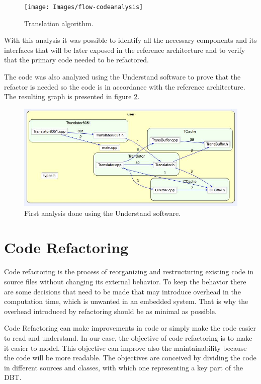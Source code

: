 \documentclass{report}
\begin{document}
	\begin{figure} [H]
		\centering
		\texttt{[image: Images/flow-codeanalysis]}
		\caption{Translation algorithm.}
		\label{fig:flowchart-codeanalysis}
	\end{figure}	
	
	\par With this analysis it was possible to identify all the necessary components and its interfaces that will be later exposed in the reference architecture and to verify that the primary code needed to be refactored.

	\par The code was also analyzed using the Understand software to prove that the refactor is needed so the code is in accordance with the reference architecture. The resulting graph is presented in figure \ref{fig:understand1}.
	
	\begin{figure} [H]
		\centering
		\includegraphics[width=0.6\linewidth]{Images/refactor1.jpg}
		\caption{First analysis done using the Understand software.}
		\label{fig:understand1}
	\end{figure}

	\section{Code Refactoring}
	Code refactoring is the process of reorganizing and restructuring existing code in source files without changing its external behavior. To keep the behavior there are some decisions that need to be made that may introduce overhead in the computation time, which is unwanted in an embedded system. That is why the overhead introduced by refactoring should be as minimal as possible.
	
	Code Refactoring can make improvements in code or simply make the code easier to read and understand.
	In our case, the objective of code refactoring is to make it easier to model. This objective can improve also the maintainability because the code will be more readable. The objectives are conceived by dividing the code in different sources and classes, with which one representing a key part of the DBT.
	
\end{document}

